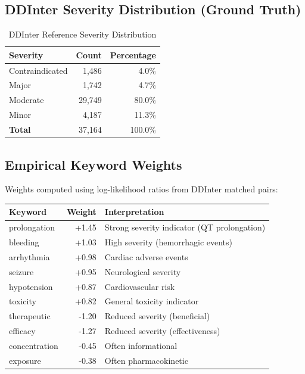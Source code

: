 \documentclass[11pt,a4paper]{article}
\begin{document}
\subsection{DDInter Severity Distribution (Ground Truth)}

\begin{table}[h]
\centering
\caption{DDInter Reference Severity Distribution}
\begin{tabular}{@{}lrr@{}}
\toprule
\textbf{Severity} & \textbf{Count} & \textbf{Percentage} \\
\midrule
Contraindicated & 1,486 & 4.0\% \\
Major & 1,742 & 4.7\% \\
Moderate & 29,749 & 80.0\% \\
Minor & 4,187 & 11.3\% \\
\midrule
\textbf{Total} & 37,164 & 100.0\% \\
\bottomrule
\end{tabular}
\end{table}

\subsection{Empirical Keyword Weights}

Weights computed using log-likelihood ratios from DDInter matched pairs:

\begin{longtable}{@{}lrl@{}}
\toprule
\textbf{Keyword} & \textbf{Weight} & \textbf{Interpretation} \\
\midrule
\endhead
prolongation & +1.45 & Strong severity indicator (QT prolongation) \\
bleeding & +1.03 & High severity (hemorrhagic events) \\
arrhythmia & +0.98 & Cardiac adverse events \\
seizure & +0.95 & Neurological severity \\
hypotension & +0.87 & Cardiovascular risk \\
toxicity & +0.82 & General toxicity indicator \\
\midrule
therapeutic & -1.20 & Reduced severity (beneficial) \\
efficacy & -1.27 & Reduced severity (effectiveness) \\
concentration & -0.45 & Often informational \\
exposure & -0.38 & Often pharmacokinetic \\
\bottomrule
\end{longtable}
\end{document}
